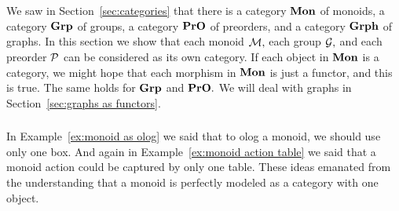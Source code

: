 \documentclass[../main/CT4S-EN-RU]{subfiles}
\begin{document}
\section{}


\subsection{}\label{sec:mon grp pro as cat}

\begin{blockENG}
We saw in Section~\ref{sec:categories} that there is a category ${\mathbf{Mon}}$ of monoids, a category ${\mathbf{Grp}}$ of groups, a category ${\mathbf{PrO}}$ of preorders, and a category ${\mathbf{Grph}}$ of graphs. In this section we show that each monoid $\mathcal{M},$ each group $\mathcal{G},$ and each preorder $\mathcal{P}$ can be considered as its own category. If each object in ${\mathbf{Mon}}$ is a category, we might hope that each morphism in ${\mathbf{Mon}}$ is just a functor, and this is true. The same holds for ${\mathbf{Grp}}$ and ${\mathbf{PrO}}.$ We will deal with graphs in Section~\ref{sec:graphs as functors}.
\end{blockENG}

\begin{blockRUS}
\end{blockRUS}


\subsubsection{}\label{sec:monoids as cats}

\begin{blockENG}
In Example~\ref{ex:monoid as olog} we said that to olog a monoid, we should use only one box. And again in Example~\ref{ex:monoid action table} we said that a monoid action could be captured by only one table. These ideas emanated from the understanding that a monoid is perfectly modeled as a category with one object. 
\end{blockENG}

\begin{blockRUS}
\end{blockRUS}

\paragraph{} ~\\
\end{document}
